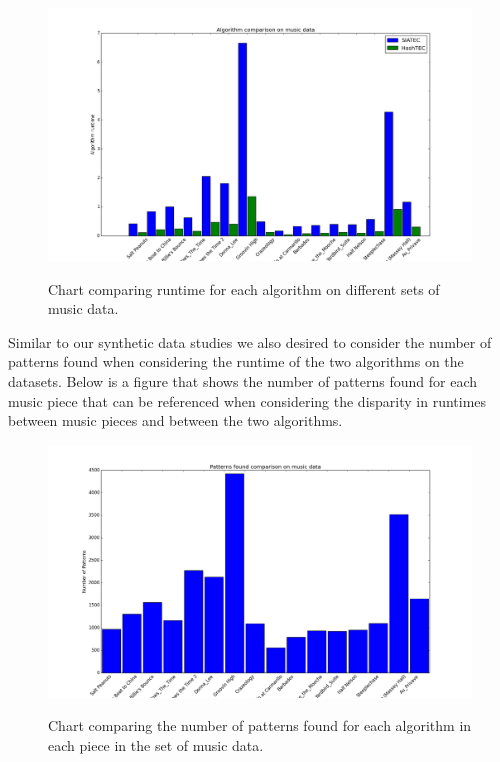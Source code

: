 \documentclass[12pt]{article}
\begin{document}
\FloatBarrier
\begin{figure}[!htbp]
  \centering
  \includegraphics[width=.8\textwidth]{comp_algs_runtimes_on_music}
  \label{fig:figure6}
  \caption{Chart comparing runtime for each algorithm on different sets of music data.}
\end{figure}
\FloatBarrier

Similar to our synthetic data studies we also desired to consider the number of patterns found when considering the runtime of the two algorithms on the datasets. Below is a figure that shows the number of patterns found for each music piece that can be referenced when considering the disparity in runtimes between music pieces and between the two algorithms.

\FloatBarrier
\begin{figure}[!htbp]
  \centering
  \includegraphics[width=.8\textwidth]{patterns_found_comp_music_data}
  \label{fig:figure7}
  \caption{Chart comparing the number of patterns found for each algorithm in each piece in the set of music data.}
\end{figure}
\FloatBarrier
\end{document}
